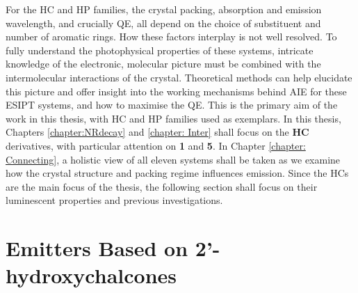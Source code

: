 For the \ac{HC} and \ac{HP} families, the crystal packing, absorption and emission wavelength, and crucially \ac{QE}, all depend on the choice of substituent and number of aromatic rings. How these factors interplay is not well resolved. To fully understand the photophysical properties of these systems, intricate knowledge of the electronic, molecular picture must be combined with the intermolecular interactions of the crystal. Theoretical methods can help elucidate this picture and offer insight into the working mechanisms behind \ac{AIE} for these \ac{ESIPT} systems, and how to maximise the \ac{QE}. This is the primary aim of the work in this thesis, with \ac{HC} and \ac{HP} families used as exemplars. In this thesis, Chapters \ref{chapter:NRdecay} and \ref{chapter: Inter} shall focus on the \textbf{HC} derivatives, with particular attention on \textbf{1} and \textbf{5}. In Chapter \ref{chapter: Connecting}, a holistic view of all eleven systems shall be taken as we examine how the crystal structure and packing regime influences emission. Since the \acp{HC} are the main focus of the thesis, the following section shall focus on their luminescent properties and previous investigations.  
\section{Emitters Based on 2'-hydroxychalcones}\label{section: lom HC}

